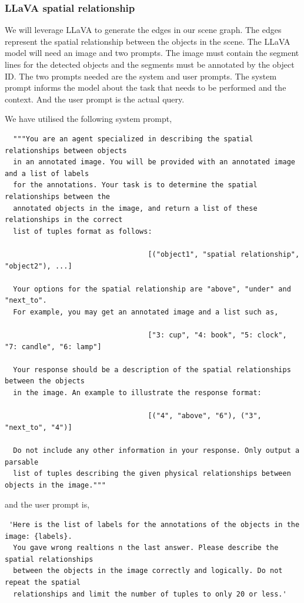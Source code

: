 \subsubsection{LLaVA spatial relationship}
We will leverage LLaVA to generate the edges in our scene graph. The edges represent the spatial relationship between the objects in the scene. 
The LLaVA model will need an image and two prompts. The image must contain the segment lines for the detected objects and the segments must be annotated by the object ID. 
The two prompts needed are the system and user prompts. The system prompt informs the model about the task that needs to be performed and the context. 
And the user prompt is the actual query. 

We have utilised the following system prompt, 
\begin{lstlisting}
  """You are an agent specialized in describing the spatial relationships between objects 
  in an annotated image. You will be provided with an annotated image and a list of labels
  for the annotations. Your task is to determine the spatial relationships between the 
  annotated objects in the image, and return a list of these relationships in the correct 
  list of tuples format as follows: 

                                  [("object1", "spatial relationship", "object2"), ...] 

  Your options for the spatial relationship are "above", "under" and "next_to". 
  For example, you may get an annotated image and a list such as, 

                                  ["3: cup", "4: book", "5: clock", "7: candle", "6: lamp"]

  Your response should be a description of the spatial relationships between the objects
  in the image. An example to illustrate the response format: 

                                  [("4", "above", "6"), ("3", "next_to", "4")]

  Do not include any other information in your response. Only output a parsable 
  list of tuples describing the given physical relationships between objects in the image."""
\end{lstlisting}
 and the user prompt is, 
 \begin{lstlisting}
 'Here is the list of labels for the annotations of the objects in the image: {labels}. 
  You gave wrong realtions n the last answer. Please describe the spatial relationships 
  between the objects in the image correctly and logically. Do not repeat the spatial 
  relationships and limit the number of tuples to only 20 or less.'
\end{lstlisting}
